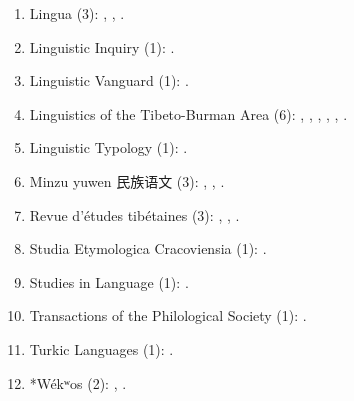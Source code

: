\documentclass[oneside,a4paper,11pt]{article}
\newcommand{\zh}[1]{{\cn #1}}
\begin{document}
\begin{enumerate}
 \item Lingua (3):  \cite{jacques11lingua}, \cite{jacques12incorp}, \cite{jacques14antipassive}.
 \item Linguistic Inquiry (1): \cite{antonov14need}.
 \item Linguistic Vanguard (1): \cite{jacques16th}.
 \item Linguistics of the Tibeto-Burman Area (6): \cite{jacques09wazur}, \cite{jacques13tropative}, \cite{jacques14linking}, \cite{jacques15spontaneous}, \cite{jacques16si}, \cite{jacques16complementation}.
 \item Linguistic Typology (1): \cite{jacques13harmonization}.
 \item Minzu yuwen \zh{民族语文} (3): \cite{jacques03s.houzhui}, \cite{jacques04redupl}, \cite{jacques08weiyu}.
 \item Revue d'études tibétaines (3): \cite{jacques07naksatram},  \cite{jacques08debther},   \cite{jacques10ndr}.
 \item Studia Etymologica Cracoviensia (1):  \cite{jacques13vama}.
  \item Studies in Language (1): \cite{jacques14auditory}.
  \item Transactions of the Philological Society (1):  \cite{jacques12internal}.
  \item Turkic Languages (1): \cite{antonov12kumush}.
\item *Wékʷos (2): \cite{jacques14honey}, \cite{jacques16camara}.
 \end{enumerate} 
 
\end{document}
